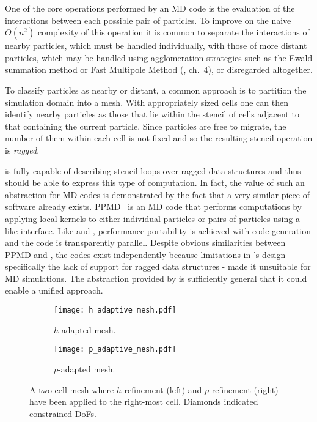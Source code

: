 \documentclass[thesis]{subfiles}
\begin{document}
\begin{description}
    One of the core operations performed by an MD code is the evaluation of the interactions between each possible pair of particles.
    To improve on the naive $O(n^2)$ complexity of this operation it is common to separate the interactions of nearby particles, which must be handled individually, with those of more distant particles, which may be handled using agglomeration strategies such as the Ewald summation method or Fast Multipole Method (\cite{saundersDevelopmentPerformancePortableFramework2019}, ch.~4), or disregarded altogether.

    To classify particles as nearby or distant, a common approach is to partition the simulation domain into a mesh.
    With appropriately sized cells one can then identify nearby particles as those that lie within the stencil of cells adjacent to that containing the current particle.
    Since particles are free to migrate, the number of them within each cell is not fixed and so the resulting stencil operation is \emph{ragged}.

     is fully capable of describing stencil loops over ragged data structures and thus should be able to express this type of computation.
    In fact, the value of such an abstraction for MD codes is demonstrated by the fact that a very similar piece of software already exists.
    PPMD~\cite{saundersDomainSpecificLanguage2018} is an MD code that performs computations by applying local kernels to either individual particles or pairs of particles using a -like interface.
    Like  and , performance portability is achieved with code generation and the code is transparently parallel.
    Despite obvious similarities between PPMD and , the codes exist independently because limitations in 's design - specifically the lack of support for ragged data structures - made it unsuitable for MD simulations.
    The abstraction provided by  is sufficiently general that it could enable a unified approach.
\end{description}

\begin{figure}
  \centering
  \begin{subfigure}{.49\textwidth}
    \centering
    \texttt{[image: h\_adaptive\_mesh.pdf]}
    \caption{$h$-adapted mesh.}
    \label{fig:h_adaptive_mesh}
  \end{subfigure}
  \begin{subfigure}{.49\textwidth}
    \centering
    \texttt{[image: p\_adaptive\_mesh.pdf]}
    \caption{$p$-adapted mesh.}
  \end{subfigure}

  \caption{
    A two-cell mesh where $h$-refinement (left) and $p$-refinement (right) have been applied to the right-most cell.
    Diamonds indicated constrained DoFs.
  }
  \label{fig:adaptive_mesh}
\end{figure}
\end{document}
